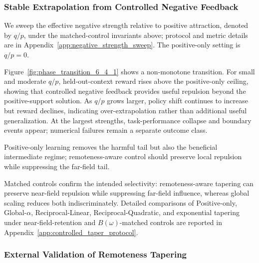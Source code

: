 \documentclass{article}
\theoremstyle{plain}
\theoremstyle{definition}
\theoremstyle{remark}
\begin{document}
\subsubsection{Stable Extrapolation from Controlled Negative Feedback}
\label{sec:controlled_negative_strength}



We sweep the effective negative strength relative to positive attraction,
denoted by $q/p$, under the matched-control invariants above; protocol and
metric details are in Appendix~\ref{app:negative_strength_sweep}. The
positive-only setting is $q/p=0$.

Figure~\ref{fig:phase_transition_6_4_1} shows a non-monotone transition.
For small and moderate $q/p$, held-out-context reward rises above the
positive-only ceiling, showing that controlled negative feedback provides
useful repulsion beyond the positive-support solution. As $q/p$ grows
larger, policy shift continues to increase but reward declines,
indicating over-extrapolation rather than additional useful
generalization. At the largest strengths, task-performance collapse and
boundary events appear; numerical failures remain a separate outcome class.

Positive-only learning removes the harmful tail but also the beneficial
intermediate regime; remoteness-aware control should preserve local repulsion
while suppressing the far-field tail.


Matched controls confirm the intended selectivity: remoteness-aware tapering can
preserve near-field repulsion while suppressing far-field influence, whereas
global scaling reduces both indiscriminately. Detailed comparisons of
Positive-only, Global-\(\alpha\), Reciprocal-Linear, Reciprocal-Quadratic, and
exponential tapering under near-field-retention and \(B(\omega)\)-matched
controls are reported in Appendix~\ref{app:controlled_taper_protocol}.

\subsubsection{External Validation of Remoteness Tapering}
\label{sec:external_tapers}

\begin{table}
\vspace{-0.7em}
\centering
\caption{\textbf{Protocol-matched external transfer.}
D4RL aggregate and nine-task structured-generation (SG-9) macro Pass@8.}
\label{tab:taper_transfer_summary}
\scriptsize
\renewcommand{\arraystretch}{0.88}
\vspace{-0.5em}
\end{table}
\end{document}
